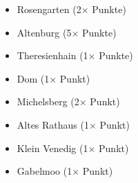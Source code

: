 \documentclass[a5paper,ngerman]{scrartcl}
\begin{document}
\begin{enumerate}
\begin{multicols}{2}
    \begin{itemize}
    \setlength\itemsep{0em}
    \item Rosengarten (2$\times$ Punkte)
    \item Altenburg (5$\times$ Punkte)
    \item Theresienhain (1$\times$ Punkte)
    \item Dom (1$\times$ Punkt)
    \item Michelsberg (2$\times$ Punkt)
    \item Altes Rathaus (1$\times$ Punkt)
    \item Klein Venedig (1$\times$ Punkt)
    \item Gabelmoo (1$\times$ Punkt)
    \end{itemize}
    \end{multicols}
\end{enumerate}
\end{document}
